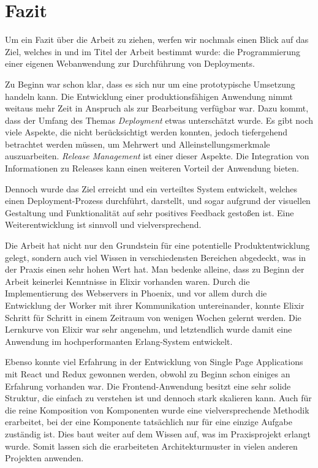 \chapter{Fazit}

Um ein Fazit über die Arbeit zu ziehen, werfen wir nochmals einen Blick auf das Ziel, welches in  und im Titel der Arbeit bestimmt wurde: die Programmierung einer eigenen Webanwendung zur Durchführung von Deployments.

Zu Beginn war schon klar, dass es sich nur um eine prototypische Umsetzung handeln kann. Die Entwicklung einer produktionsfähigen Anwendung nimmt weitaus mehr Zeit in Anspruch als zur Bearbeitung verfügbar war. Dazu kommt, dass der Umfang des Themas \emph{Deployment} etwas unterschätzt wurde. Es gibt noch viele Aspekte, die nicht berücksichtigt werden konnten, jedoch tiefergehend betrachtet werden müssen, um Mehrwert und Alleinstellungsmerkmale auszuarbeiten. \emph{Release Management} ist einer dieser Aspekte. Die Integration von Informationen zu Releases kann einen weiteren Vorteil der Anwendung bieten.

Dennoch wurde das Ziel erreicht und ein verteiltes System entwickelt, welches einen Deployment-Prozess durchführt, darstellt, und sogar aufgrund der visuellen Gestaltung und Funktionalität auf sehr positives Feedback gestoßen ist. Eine Weiterentwicklung ist sinnvoll und vielversprechend.

Die Arbeit hat nicht nur den Grundstein für eine potentielle Produktentwicklung gelegt, sondern auch viel Wissen in verschiedensten Bereichen abgedeckt, was in der Praxis einen sehr hohen Wert hat. Man bedenke alleine, dass zu Beginn der Arbeit keinerlei Kenntnisse in Elixir vorhanden waren. Durch die Implementierung des Webservers in Phoenix, und vor allem durch die Entwicklung der Worker mit ihrer Kommunikation untereinander, konnte Elixir Schritt für Schritt in einem Zeitraum von wenigen Wochen gelernt werden. Die Lernkurve von Elixir war sehr angenehm, und letztendlich wurde damit eine Anwendung im hochperformanten Erlang-System entwickelt.

Ebenso konnte viel Erfahrung in der Entwicklung von Single Page Applications mit React und Redux gewonnen werden, obwohl zu Beginn schon einiges an Erfahrung vorhanden war. Die Frontend-Anwendung besitzt eine sehr solide Struktur, die einfach zu verstehen ist und dennoch stark skalieren kann. Auch für die reine Komposition von Komponenten wurde eine vielversprechende Methodik erarbeitet, bei der eine Komponente tatsächlich nur für eine einzige Aufgabe zuständig ist. Dies baut weiter auf dem Wissen auf, was im Praxisprojekt \citep{Maemecke2017} erlangt wurde. Somit lassen sich die erarbeiteten Architekturmuster in vielen anderen Projekten anwenden.

